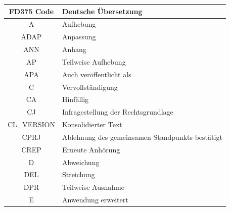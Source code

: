     \begin{table}[h]
        \centering
        \begin{tabular}{|c|l|}\hline
            FD375 Code & Deutsche Übersetzung \\\hline \hline
            A & Aufhebung \\\hline
            ADAP & Anpassung \\\hline
            ANN & Anhang \\\hline
            AP & Teilweise Aufhebung \\\hline
            APA & Auch veröffentlicht als \\\hline
            C & Vervollständigung \\\hline
            CA & Hinfällig \\\hline
            CJ & Infragestellung der Rechtsgrundlage \\\hline
            CL\_VERSION & Konsolidierter Text \\\hline
            CPRJ & Ablehnung des gemeinsamen Standpunkts bestätigt \\\hline
            CREP & Erneute Anhörung \\\hline
            D & Abweichung \\\hline
            DEL & Streichung \\\hline
            DPR & Teilweise Ausnahme \\\hline
            E & Anwendung erweitert \\\hline

\end{tabular}
\end{table}
